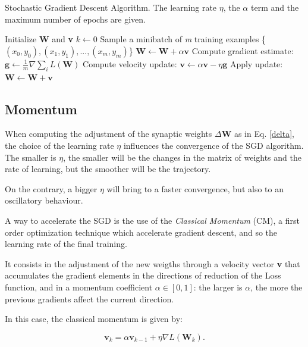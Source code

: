 		\begin{algorithm}[H]
			\caption{Stochastic Gradient Descent Algorithm. The learning rate $\eta$, the $\alpha$ term and the maximum number of epochs are given.}
			\label{alg:sgd}
			\begin{algorithmic}[1]
					\State Initialize \textbf{W} and \textbf{v}
					\State $k \gets 0$
						\State Sample a minibatch of \textit{m} training examples \{\textit{$(x_0,y_0),(x_1,y_1),...,(x_m,y_m)$}\}
							\State $\textbf{W} \gets \textbf{W} + \alpha \textbf{v}$
						\EndIf
						\State Compute gradient estimate: $\textbf{g} \gets \frac {1}{m} \nabla \sum_i\textit{L}(\textbf{W})$
						\State Compute velocity update: $\textbf{v} \gets \alpha \textbf{v} - \eta \textbf{g}$
						\State Apply update: $\textbf{W} \gets \textbf{W} + \textbf{v}$
					\EndWhile
				\EndProcedure
			\end{algorithmic}
		\end{algorithm}


		\subsection{Momentum}
		\label{sec:momentum}
			When computing the adjustment of the synaptic weights $\Delta\textbf{W}$ as in Eq. \ref{delta}, the choice of the learning rate $\eta$ influences the convergence of the SGD algorithm.
			The smaller is $\eta$, the smaller will be the changes in the matrix of weights and the rate of learning, but the smoother will be the trajectory.

			On the contrary, a bigger $\eta$ will bring to a faster convergence, but also to an oscillatory behaviour.

			A way to accelerate the SGD is the use of the \textit{Classical Momentum} (CM), a first order optimization technique which accelerate gradient descent, and so the learning rate of the final training.

			It consists in the adjustment of the new weigths through a velocity vector \textbf{v} that accumulates the gradient elements in the directions of reduction of the Loss function, and in a momentum coefficient $\alpha \in [0,1]$: the larger is  $\alpha$, the more the previous gradients affect the current direction.

			In this case, the classical momentum is given by:

			\begin{equation}
				\label{classical_momentum}
				\textbf{v}_k = \alpha\textbf{v}_{k-1} + \eta\nabla\textit{L}(\textbf{W}_k).
			\end{equation}


